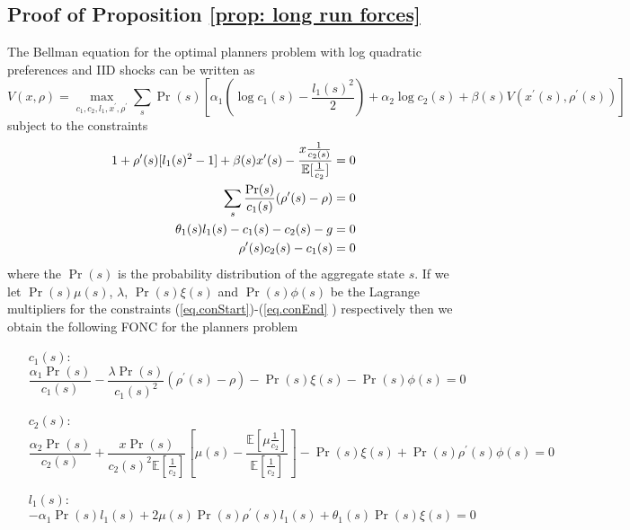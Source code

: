 \documentclass[thmsb,11pt]{article}
\begin{document}
\begin{appendix}
\section{Proof of Proposition \protect\ref{prop: long run forces}}

The Bellman equation for the optimal planners problem with log quadratic
preferences and IID shocks can be written as
\begin{equation*}
V(x,\rho) = \max_{c_1,c_2,l_1,x^{\prime },\rho^{\prime }} \sum_s \Pr(s)\left[%
\alpha_1\left(\log c_1(s) -\frac{l_1(s)^2}{2}\right)+\alpha_2\log
c_2(s)+\beta(s) V(x^{\prime }(s),\rho^{\prime }(s))\right]
\end{equation*}%
subject to the constraints
\begin{align}
1+\rho^{\prime }(s)[l_1(s)^2-1]+\beta(s)x^{\prime }(s) - \frac{x\frac{1}{%
c_2(s)}}{\mathbb{E}[\frac1{c_2}]}=0  \label{eq.conStart} \\
\sum_s\frac{\Pr(s)}{c_1(s)}(\rho^{\prime }(s)-\rho) = 0 \\
\theta_1(s)l_1(s) -c_1(s)-c_2(s)-g = 0 \\
\rho^{\prime }(s) c_2(s)-c_1(s) = 0  \label{eq.conEnd}
\end{align}
where the $\Pr(s)$ is the probability distribution of the aggregate state $s$. If
we let $\Pr(s)\mu(s)$, $\lambda$, $\Pr(s)\xi(s)$ and $\Pr(s)\phi(s)$ be the
Lagrange multipliers for the constraints (\ref{eq.conStart})-(\ref{eq.conEnd}%
) respectively then we obtain the following FONC for the planners problem

\begin{enumerate}
\item[$c_1(s):$]
\begin{equation}
\frac{\alpha_1\Pr(s)}{c_1(s)}-\frac{\lambda \Pr(s)}{c_1(s)^2}(\rho^{\prime
}(s)-\rho)-\Pr(s)\xi(s)-\Pr(s)\phi(s) = 0  \label{eq.c1FOC}
\end{equation}

\item[$c_2(s):$]
\begin{equation}
\frac{\alpha_2 \Pr(s)}{c_2(s)} + \frac{x\Pr(s)}{c_2(s)^2\mathbb{E}[\frac1{c_2}]}%
\left[\mu(s)-\frac{\mathbb{E}[\mu\frac1{c_2}]}{\mathbb{E}[\frac1{c_2}]}%
\right]-\Pr(s)\xi(s)+\Pr(s)\rho^{\prime }(s)\phi(s)=0  \label{eq.c2FOC}
\end{equation}

\item[$l_1(s):$]
\begin{equation}
-\alpha_1\Pr(s)l_1(s)+2\mu(s)\Pr(s)\rho^{\prime
}(s)l_1(s)+\theta_1(s)\Pr(s)\xi(s)=0
\end{equation}


\end{enumerate}
\end{appendix}
\end{document}
